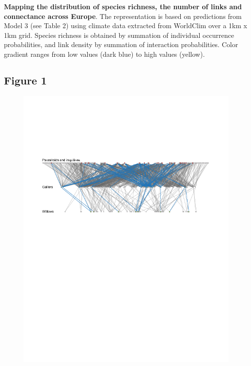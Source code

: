 \documentclass[12pt]{article}
\begin{document}
\textbf{Mapping the distribution of species richness, the number of links and
connectance across Europe}. The representation is based on predictions from
Model 3 (see Table 2) using climate data extracted from WorldClim over a 1km x
1km grid. Species richness is obtained by summation of individual occurrence
probabilities, and link density by summation of interaction probabilities.
Color gradient ranges from low values (dark blue) to high values (yellow).

\newpage

\subsection*{Figure 1}

\begin{figure}[ht!]
\centering\includegraphics[width=1\textwidth]{figures/mw_sampling.png}
\end{figure}
\end{document}

